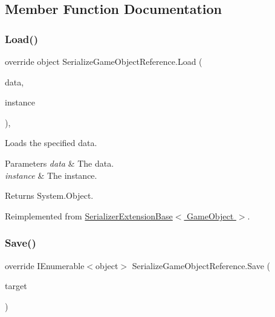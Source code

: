 \subsection{Member Function Documentation}
\mbox{\label{class_serialize_game_object_reference_a10255a41c68c84a3cc2495fb58fbc235}} 
\subsubsection{\texorpdfstring{Load()}{Load()}}
{\footnotesize\ttfamily override object Serialize\+Game\+Object\+Reference.\+Load (\begin{DoxyParamCaption}\item[{object \mbox{[}$\,$\mbox{]}}]{data,  }\item[{object}]{instance }\end{DoxyParamCaption})\hspace{0.3cm}{\ttfamily [inline]}, {\ttfamily [virtual]}}



Loads the specified data. 


\begin{DoxyParams}{Parameters}
{\em data} & The data.\\
\hline
{\em instance} & The instance.\\
\hline
\end{DoxyParams}
\begin{DoxyReturn}{Returns}
System.\+Object.
\end{DoxyReturn}


Reimplemented from \hyperlink{class_serializer_extension_base_a3792a9b27056e30ca0ac91531936ae47}{Serializer\+Extension\+Base$<$ Game\+Object $>$}.

\mbox{\label{class_serialize_game_object_reference_a787a0671d47d542cd3df6f40c486d321}} 
\subsubsection{\texorpdfstring{Save()}{Save()}}
{\footnotesize\ttfamily override I\+Enumerable$<$object$>$ Serialize\+Game\+Object\+Reference.\+Save (\begin{DoxyParamCaption}\item[{Game\+Object}]{target }\end{DoxyParamCaption})\hspace{0.3cm}{\ttfamily [inline]}}



